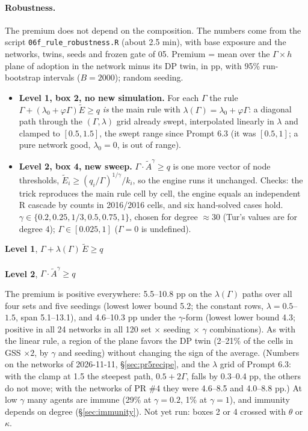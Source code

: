 \documentclass[11pt,a4paper]{article}
\newcommand{\Ee}{\tilde{E}}                 %
\newcommand{\Acount}{\tilde{A}}             %
\newcommand{\code}[1]{\texttt{#1}}
\begin{document}
\paragraph{Robustness.} The premium does not depend on the composition. The numbers come from
the script \code{06f\_rule\_robustness.R} (about 2.5 min), with base exposure and the
networks, twins, seeds and frozen gate of 05. Premium = mean over the $\Gamma \times h$ plane of
adoption in the network minus its DP twin, in pp, with 95\% run-bootstrap intervals
($B = 2000$); random seeding.
\begin{itemize}
  \item \textbf{Level 1, box 2, no new simulation.} For each $\Gamma$ the rule
    $\Gamma + (\lambda_0 + \varphi\Gamma)\Ee \ge q$ \emph{is} the main rule with
    $\lambda(\Gamma) = \lambda_0 + \varphi\Gamma$: a diagonal path through the
    $(\Gamma, \lambda)$ grid already swept, interpolated linearly in $\lambda$ and clamped to
    $[0.5, 1.5]$, the swept range since Prompt 6.3 (it was $[0.5, 1]$; a pure network good,
    $\lambda_0 = 0$, is out of range).
  \item \textbf{Level 2, box 4, new sweep.} $\Gamma\cdot\Acount^{\gamma} \ge q$ is one more
    vector of node thresholds, $\Ee_i \ge (q_i/\Gamma)^{1/\gamma}/k_i$, so the engine runs it
    unchanged. Checks: the trick reproduces the main rule cell by cell, the engine equals an
    independent R cascade by counts in 2016/2016 cells, and six hand-solved cases hold.
    $\gamma \in \{0.2, 0.25, 1/3, 0.5, 0.75, 1\}$, chosen for degree $\approx 30$ (Tur's values
    are for degree 4); $\Gamma \in [0.025, 1]$ ($\Gamma = 0$ is undefined).
\end{itemize}
\begin{center}
\small
\textbf{Level 1}, $\Gamma + \lambda(\Gamma)\,\Ee \ge q$\\[2pt]
\\[8pt]
\textbf{Level 2}, $\Gamma\cdot\Acount^{\gamma} \ge q$\\[2pt]

\end{center}
\noindent The premium is positive everywhere: 5.5--10.8 pp on the $\lambda(\Gamma)$ paths over
all four sets and five seedings (lowest lower bound 5.2; the constant rows, $\lambda = 0.5$--$1.5$, span
5.1--13.1), and 4.6--10.3 pp under the
$\gamma$-form (lowest lower bound 4.3; positive in all 24 networks in all 120
set $\times$ seeding $\times$ $\gamma$ combinations). As with the
linear rule, a region of the plane favors the DP twin (2--21\% of the cells in GSS $\times2$,
by $\gamma$ and seeding) without changing the sign of the average. (Numbers on the networks of
2026-11-11, \S\ref{sec:pr5recipe}, and the $\lambda$ grid of Prompt 6.3: with the clamp at 1.5 the
steepest path, $0.5 + 2\Gamma$, falls by 0.3--0.4 pp, the others do not move; with the networks of PR \#4 they
were 4.6--8.5 and 4.0--8.8 pp.) At low $\gamma$ many agents are immune
(29\% at $\gamma = 0.2$, 1\% at $\gamma = 1$), and immunity depends on degree
(\S\ref{sec:immunity}). Not yet run: boxes 2 or 4 crossed with $\theta$ or $\kappa$.
\end{document}
